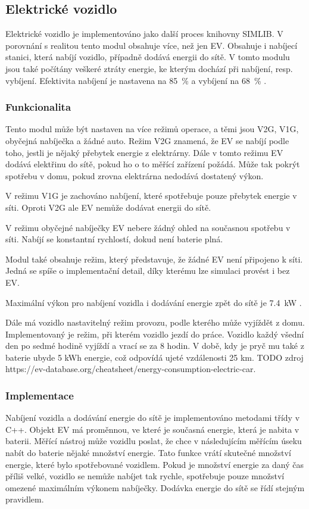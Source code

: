 \documentclass[12pt,a4paper]{Cotmas-2018}
\begin{document}
\newpage

\subsection{Elektrické vozidlo}
Elektrické vozidlo je implementováno jako další proces knihovny SIMLIB.
V porovnání s realitou tento modul obsahuje více, než jen EV.
Obsahuje i nabíjecí stanici, která nabíjí vozidlo, případně dodává energii do sítě.
V tomto modulu jsou také počítány veškeré ztráty energie, ke kterým dochází při nabíjení, resp. vybíjení.
Efektivita nabíjení je nastavena na 85~\% a vybíjení na 68~\% \cite{Shirazi-2018}.

\subsubsection{Funkcionalita}
Tento modul může být nastaven na více režimů operace, a těmi jsou V2G, V1G, obyčejná nabíječka a žádné auto.
Režim V2G znamená, že EV se nabíjí podle toho, jestli je nějaký přebytek energie z elektrárny.
Dále v tomto režimu EV dodává elektřinu do sítě, pokud ho o to měřící zařízení požádá.
Může tak pokrýt spotřebu v domu, pokud zrovna elektrárna nedodává dostatený výkon.

V režimu V1G je zachováno nabíjení, které spotřebuje pouze přebytek energie v síti.
Oproti V2G ale EV nemůže dodávat energii do sítě.

V režimu obyčejné nabíječky EV nebere žádný ohled na současnou spotřebu v síti.
Nabíjí se konstantní rychlostí, dokud není baterie plná.

Modul také obsahuje režim, který představuje, že žádné EV není připojeno k síti.
Jedná se spíše o implementační detail, díky kterému lze simulaci provést i bez EV.

Maximální výkon pro nabíjení vozidla i dodávání energie zpět do sítě je 7.4~kW \cite{Svarc-2022}.

Dále má vozidlo nastavitelný režim provozu, podle kterého může vyjíždět z domu.
Implementovaný je režim, při kterém vozidlo jezdí do práce.
Vozidlo každý všední den po sedmé hodině vyjíždí a vrací se za 8 hodin.
V době, kdy je pryč mu také z baterie ubyde 5 kWh energie,
což odpovídá ujeté vzdálenosti 25 km. TODO zdroj https://ev-database.org/cheatsheet/energy-consumption-electric-car.

\subsubsection{Implementace}
Nabíjení vozidla a dodávání energie do sítě je implementováno metodami třídy v C++.
Objekt EV má proměnnou, ve které je současná energie, která je nabita v baterii.
Měřící nástroj může vozidlu poslat, že chce v následujícím měřícím úseku nabít do baterie nějaké množství energie.
Tato funkce vrátí skutečné množství energie, které bylo spotřebované vozidlem.
Pokud je množství energie za daný čas příliš velké,
vozidlo se nemůže nabíjet tak rychle, spotřebuje pouze množství omezené maximálním výkonem nabíječky.
Dodávka energie do sítě se řídí stejným pravidlem.
\end{document}
